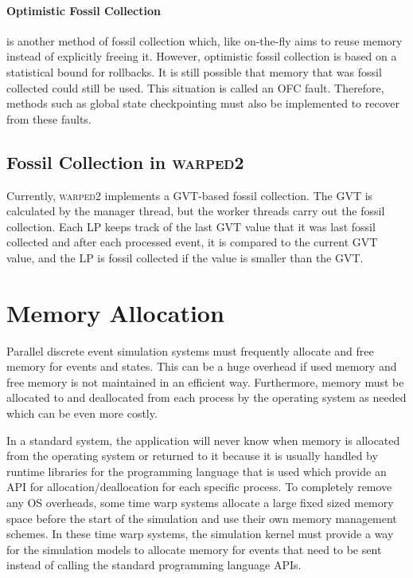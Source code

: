 \documentclass[11pt]{book}
\begin{document}
\paragraph{Optimistic Fossil Collection} is another method of fossil collection which, like
on-the-fly aims to reuse memory instead of explicitly freeing it. However, optimistic fossil
collection is based on a statistical bound for rollbacks. It is still possible that memory that
was fossil collected could still be used. This situation is called an OFC fault. Therefore,
methods such as global state checkpointing must also be implemented to recover from these faults.

\subsection{Fossil Collection in \textsc{warped2}}

Currently, \textsc{warped2} implements a GVT-based fossil collection. The GVT is calculated by
the manager thread, but the worker threads carry out the fossil collection. Each LP keeps track
of the last GVT value that it was last fossil collected and after each processed event, it is
compared to the current GVT value, and the LP is fossil collected if the value is smaller than
the GVT.

\section{Memory Allocation}

Parallel discrete event simulation systems must frequently allocate and free memory for
events and states. This can be a huge overhead if used memory and free memory is not
maintained in an efficient way. Furthermore, memory must be allocated to and deallocated from
each process by the operating system as needed which can be even more costly.

In a standard system, the application will never know when memory is allocated from the operating
system or returned to it because it is usually handled by runtime libraries for the programming
language that is used which provide an API for allocation/deallocation for each specific
process. To completely remove any OS overheads, some time warp systems allocate a large fixed
sized memory space before the start of the simulation and use their own memory management
schemes. In these time warp systems, the simulation kernel must provide a way for the simulation
models to allocate memory for events that need to be sent instead of calling the standard programming
language APIs.
\end{document}
